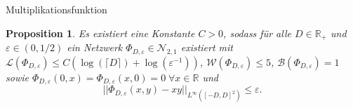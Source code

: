 \documentclass[10pt,aspectratio=169]{beamer}
\newtheorem{proposition}[theorem]{Proposition}
\newcommand{\R}{\mathbb{R}} %
\begin{document}
\begin{frame}{Multiplikationsfunktion}
    \begin{proposition} %
        Es existiert eine Konstante \(C>0\), sodass für alle \(D\in \R_+\) und \(\varepsilon \in (0, 1/2)\) 
        ein Netzwerk \(\Phi_{D,\varepsilon} \in \mathcal{N}_{2,1}\) existiert mit 
        \(\mathcal{L}(\Phi_{D, \varepsilon}) \leq C (\log(\lceil D \rceil) + \log(\varepsilon^{-1})) \), 
        \(\mathcal{W}(\Phi_{D, \varepsilon}) \leq 5\), \(\mathcal{B}(\Phi_{D, \varepsilon}) = 1\) sowie 
        \(\Phi_{D,\varepsilon}(0,x) = \Phi_{D,\varepsilon}(x,0) = 0 \;\forall x\in \R\) und 
        \[ ||\Phi_{D,\varepsilon}(x,y) - xy||_{L^\infty([-D,D]^2)} \leq \varepsilon. \]
    \end{proposition}
\end{frame}
\end{document}
